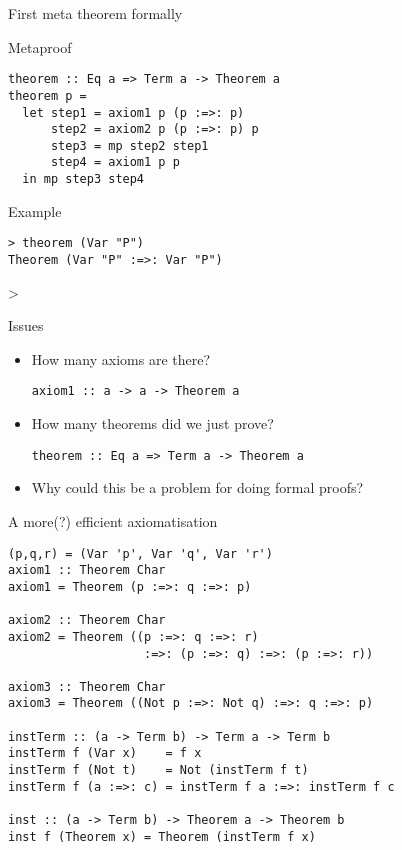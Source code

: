 \documentclass[presentation]{beamer}
\begin{document}
\begin{frame}[fragile,label={sec:orgheadline9}]{First meta theorem formally}
 \begin{block}{Metaproof}
\begin{verbatim}
theorem :: Eq a => Term a -> Theorem a
theorem p =
  let step1 = axiom1 p (p :=>: p)
      step2 = axiom2 p (p :=>: p) p
      step3 = mp step2 step1
      step4 = axiom1 p p
  in mp step3 step4
\end{verbatim}
\end{block}

\begin{block}{Example}
\begin{verbatim}
> theorem (Var "P")
Theorem (Var "P" :=>: Var "P")
\end{verbatim}
>
\end{block}
\end{frame}
\begin{frame}[fragile,label={sec:orgheadline10}]{Issues}
 \begin{itemize}
\item How many axioms are there?

\begin{verbatim}
axiom1 :: a -> a -> Theorem a
\end{verbatim}

\item How many theorems did we just prove?

\begin{verbatim}
theorem :: Eq a => Term a -> Theorem a
\end{verbatim}

\item Why could this be a problem for doing formal proofs?
\end{itemize}
\end{frame}

\begin{frame}[fragile,label={sec:orgheadline11}]{A more(?) efficient axiomatisation}
 \small
\begin{verbatim}
(p,q,r) = (Var 'p', Var 'q', Var 'r')
axiom1 :: Theorem Char
axiom1 = Theorem (p :=>: q :=>: p)

axiom2 :: Theorem Char
axiom2 = Theorem ((p :=>: q :=>: r)
                   :=>: (p :=>: q) :=>: (p :=>: r))

axiom3 :: Theorem Char
axiom3 = Theorem ((Not p :=>: Not q) :=>: q :=>: p)

instTerm :: (a -> Term b) -> Term a -> Term b
instTerm f (Var x)    = f x
instTerm f (Not t)    = Not (instTerm f t)
instTerm f (a :=>: c) = instTerm f a :=>: instTerm f c

inst :: (a -> Term b) -> Theorem a -> Theorem b
inst f (Theorem x) = Theorem (instTerm f x)
\end{verbatim}
\end{frame}
\end{document}
